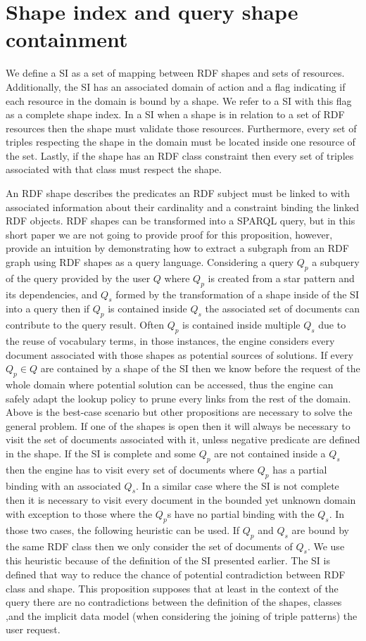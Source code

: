 \section{Shape index and query shape containment}

We define a SI as a set of mapping between RDF shapes and sets of resources.
Additionally, the SI has an associated domain of action
and a flag indicating if each resource in the domain is bound by a shape. 
We refer to a SI with this flag as a complete shape index.
In a SI when a shape is in relation to a set of RDF resources then the shape must validate those resources.
Furthermore, every set of triples respecting the shape in the domain must be located inside one resource of the set.
Lastly, if the shape has an RDF class constraint
then every set of triples associated with that class must respect the shape.

An RDF shape describes the predicates an RDF subject must be linked to with associated information about
their cardinality and a constraint binding the linked RDF objects.
RDF shapes can be transformed into a SPARQL query, but
in this short paper we are not going to provide proof for this proposition, however,
\citeauthor{Delva2021} provide an intuition by demonstrating how to extract 
a subgraph from an RDF graph using RDF shapes as a query language.
Considering a query $Q_p$ a subquery of the query provided by the user $Q$
where $Q_p$ is created from a star pattern and its dependencies, and $Q_s$ formed by the transformation of a shape inside of the SI
into a query then if  $Q_p$ is contained inside $Q_s$ the associated 
set of documents can contribute to the query result.
Often $Q_p$ is contained inside multiple $Q_s$ due to the reuse of vocabulary terms,
in those instances, the engine considers every document associated with those shapes
as potential sources of solutions.
If every $Q_p \in Q$ are contained by a shape of the SI then we know before the request of the whole domain
where potential solution can be accessed, thus the engine can safely adapt the lookup policy to prune every links from the rest of the domain.
Above is the best-case scenario but other propositions are necessary to solve the general problem.
If one of the shapes is open then it will always be necessary to visit the set of documents associated
with it, unless negative predicate are defined in the shape.
If the SI is complete and some $Q_p$ are not contained inside a $Q_s$ then the engine has to visit
every set of documents where $Q_p$ has a partial binding with an associated $Q_s$.
In a similar case where the SI is not complete then it is necessary to visit every document in the bounded yet unknown domain with exception to those
where the $Q_p$s have no partial binding with the $Q_s$.
In those two cases, the following heuristic can be used.
If $Q_p$ and $Q_s$ are bound by the same RDF class then we only consider the set of documents of $Q_s$.
We use this heuristic because of the definition of the SI presented earlier.
The SI is defined that way to reduce the chance of potential contradiction between RDF class and shape.
This proposition supposes that at least in the context of the query there are no contradictions between the
definition of the shapes, classes ,and the implicit data model (when considering the joining of triple patterns) the user request.